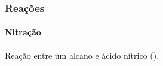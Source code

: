 \begin{frame}
\frametitle{Reações}
\framesubtitle{Nitração}

Reação entre um alcano e ácido nítrico ().

\begin{figure}
\centering
{}
\end{figure}

\end{frame}
